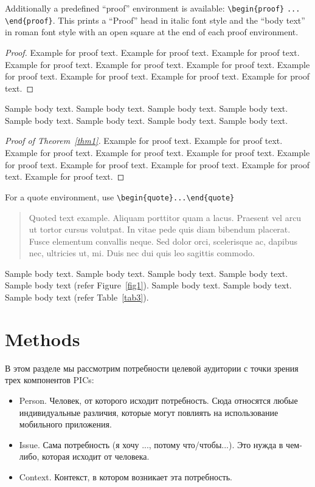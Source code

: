 \documentclass[pdflatex,sn-mathphys-num]{sn-jnl}%
\theoremstyle{thmstyleone}%
\theoremstyle{thmstyletwo}%
\theoremstyle{thmstylethree}%
\begin{document}
Additionally a predefined ``proof'' environment is available: \verb+\begin{proof}+ \verb+...+ \verb+\end{proof}+. This prints a ``Proof'' head in italic font style and the ``body text'' in roman font style with an open square at the end of each proof environment. 

\begin{proof}
Example for proof text. Example for proof text. Example for proof text. Example for proof text. Example for proof text. Example for proof text. Example for proof text. Example for proof text. Example for proof text. Example for proof text. 
\end{proof}

Sample body text. Sample body text. Sample body text. Sample body text. Sample body text. Sample body text. Sample body text. Sample body text.

\begin{proof}[Proof of Theorem~{\upshape\ref{thm1}}]
Example for proof text. Example for proof text. Example for proof text. Example for proof text. Example for proof text. Example for proof text. Example for proof text. Example for proof text. Example for proof text. Example for proof text. 
\end{proof}

\noindent
For a quote environment, use \verb+\begin{quote}...\end{quote}+
\begin{quote}
Quoted text example. Aliquam porttitor quam a lacus. Praesent vel arcu ut tortor cursus volutpat. In vitae pede quis diam bibendum placerat. Fusce elementum
convallis neque. Sed dolor orci, scelerisque ac, dapibus nec, ultricies ut, mi. Duis nec dui quis leo sagittis commodo.
\end{quote}

Sample body text. Sample body text. Sample body text. Sample body text. Sample body text (refer Figure~\ref{fig1}). Sample body text. Sample body text. Sample body text (refer Table~\ref{tab3}). 

\section{Methods}\label{sec11}

В этом разделе мы рассмотрим потребности целевой аудитории с точки зрения трех компонентов PICs:

\begin{itemize}
    \item Person. Человек, от которого исходит потребность. Сюда относятся любые индивидуальные различия, которые могут повлиять на использование мобильного приложения.
    \item Issue. Сама потребность (я хочу ..., потому что/чтобы...). Это нужда в чем-либо, которая исходит от человека.
    \item Context. Контекст, в котором возникает эта потребность.
\end{itemize}
\end{document}
